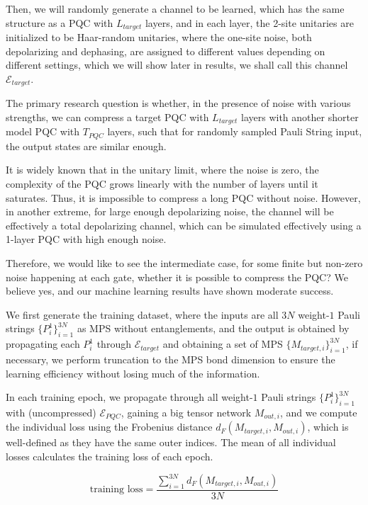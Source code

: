 \documentclass[%
 reprint,
superscriptaddress,
 amsmath,amssymb,
 aps,
]{revtex4-2}
\newcommand{\E}{\mathcal{E}}
\begin{document}
Then, we will randomly generate a channel to be learned, which has the same structure as a PQC with $L_{target}$ layers, and in each layer, the 2-site unitaries are initialized to be Haar-random unitaries, where the one-site noise, both depolarizing and dephasing, are assigned to different values depending on different settings, which we will show later in results, we shall call this channel $\E_{target}$.

The primary research question is whether, in the presence of noise with various strengths, we can compress a target PQC with $L_{target}$ layers with another shorter model PQC with $T_{PQC}$ layers, such that for randomly sampled Pauli String input, the output states are similar enough.

It is widely known that in the unitary limit, where the noise is zero, the complexity of the PQC grows linearly with the number of layers until it saturates. Thus, it is impossible to compress a long PQC without noise. However, in another extreme, for large enough depolarizing noise, the channel will be effectively a total depolarizing channel, which can be simulated effectively using a 1-layer PQC with high enough noise.

Therefore, we would like to see the intermediate case, for some finite but non-zero noise happening at each gate, whether it is possible to compress the PQC? We believe yes, and our machine learning results have shown moderate success. 

We first generate the training dataset, where the inputs are all $3N$ weight-$1$ Pauli strings $\{P^1_{i}\}_{i=1}^{3N}$ as MPS without entanglements, and the output is obtained by propagating each $P^1_i$ through $\E_{target}$ and obtaining a set of MPS $\{M_{target, i}\}_{i=1}^{3N}$, if necessary, we perform truncation to the MPS bond dimension to ensure the learning efficiency without losing much of the information.


In each training epoch, we propagate through all weight-$1$ Pauli strings $\{P^1_{i}\}_{i=1}^{3N}$ with (uncompressed) $\E_{PQC}$, gaining a big tensor network $M_{out, i}$, and we compute the individual loss using the Frobenius distance $d_F(M_{target, i}, M_{out, i})$, which is well-defined as they have the same outer indices. The mean of all individual losses calculates the training loss of each epoch.

\begin{equation}
    \text{training loss}=\frac{\sum_{i=1}^{3N}d_F(M_{target, i}, M_{out, i})}{3N}
\end{equation}
\end{document}
